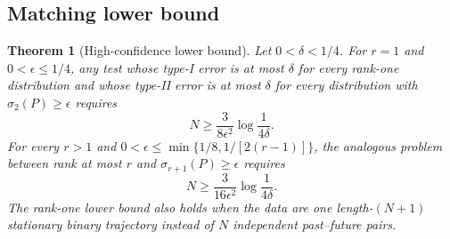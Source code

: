 \documentclass[11pt]{article}
\newtheorem{theorem}{Theorem}
\begin{document}
\subsection{Matching lower bound}

\begin{theorem}[High-confidence lower bound]
\label{thm:lower}
Let $0<\delta<1/4$. For $r=1$ and $0<\epsilon\le 1/4$, any test whose type-I error is at most $\delta$ for every rank-one distribution and whose type-II error is at most $\delta$ for every distribution with $\sigma_2(P)\ge\epsilon$ requires
\begin{equation}
    N\ge \frac{3}{8\epsilon^2}\log\!\frac{1}{4\delta}.
    \label{eq:lowerexplicit}
\end{equation}
For every $r>1$ and
$0<\epsilon\le\min\{1/8,1/[2(r-1)]\}$, the analogous problem between rank at most $r$ and $\sigma_{r+1}(P)\ge\epsilon$ requires
\begin{equation}
    N\ge \frac{3}{16\epsilon^2}\log\!\frac{1}{4\delta}.
\end{equation}
The rank-one lower bound also holds when the data are one length-$(N+1)$ stationary binary trajectory instead of $N$ independent past--future pairs.
\end{theorem}
\end{document}
